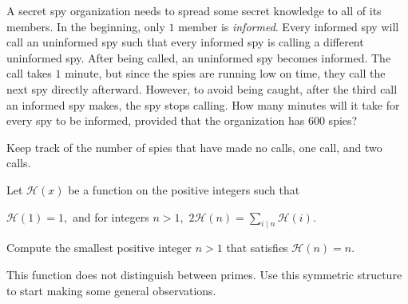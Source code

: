 \documentclass[mast]{lucky}
\begin{document}
\begin{exam}
A secret spy organization needs to spread some secret knowledge to all of its members. In the beginning, only $1$ member is \textit{informed}. Every informed spy will call an uninformed spy such that every informed spy is calling a different uninformed spy. After being called, an uninformed spy becomes informed. The call takes $1$ minute, but since the spies are running low on time, they call the next spy directly afterward. However, to avoid being caught, after the third call an informed spy makes, the spy stops calling. How many minutes will it take for every spy to be informed, provided that the organization has $600$ spies?
\end{exam}

\begin{walk}
Keep track of the number of spies that have made no calls, one call, and two calls.
\end{walk}

\begin{exam}[NARML/9]
Let $\mathcal{H}(x)$ be a function on the positive integers such that
\begin{itemize}
\Item $\mathcal{H}(1)=1,$ and
\Item for integers $n>1,$ $2\mathcal{H}(n)=\sum\limits_{i\mid n}\mathcal{H}(i).$
\end{itemize}
Compute the smallest positive integer $n>1$ that satisfies $\mathcal{H}(n)=n.$
\end{exam}
\begin{walk}
This function does not distinguish between primes. Use this symmetric structure to start making some general observations.
\end{walk}
\end{document}
